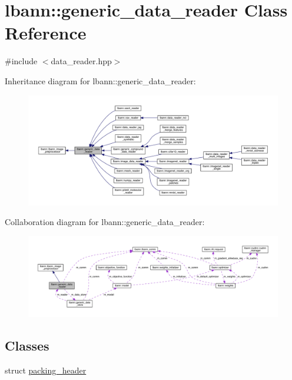 \hypertarget{classlbann_1_1generic__data__reader}{}\section{lbann\+:\+:generic\+\_\+data\+\_\+reader Class Reference}
\label{classlbann_1_1generic__data__reader}


{\ttfamily \#include $<$data\+\_\+reader.\+hpp$>$}



Inheritance diagram for lbann\+:\+:generic\+\_\+data\+\_\+reader\+:\nopagebreak
\begin{figure}[H]
\begin{center}
\leavevmode
\includegraphics[width=350pt]{classlbann_1_1generic__data__reader__inherit__graph}
\end{center}
\end{figure}


Collaboration diagram for lbann\+:\+:generic\+\_\+data\+\_\+reader\+:\nopagebreak
\begin{figure}[H]
\begin{center}
\leavevmode
\includegraphics[width=350pt]{classlbann_1_1generic__data__reader__coll__graph}
\end{center}
\end{figure}
\subsection*{Classes}
\begin{DoxyCompactItemize}
\item 
struct \hyperlink{structlbann_1_1generic__data__reader_1_1packing__header}{packing\+\_\+header}
\end{DoxyCompactItemize}
